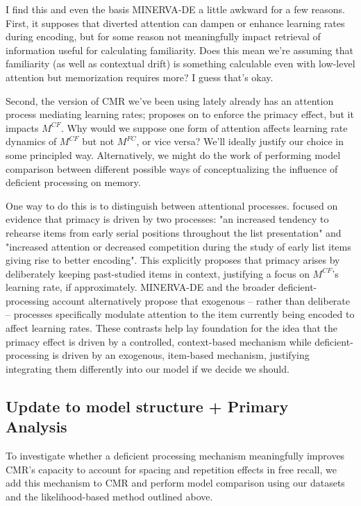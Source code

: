 I find this and even the basis MINERVA-DE a little awkward for a few reasons. First, it supposes that diverted attention can dampen or enhance learning rates during encoding, but for some reason not meaningfully impact retrieval of information useful for calculating familiarity. Does this mean we're assuming that familiarity (as well as contextual drift) is something calculable even with low-level attention but memorization requires more? I guess that's okay.

Second, the version of CMR we've been using lately already has an attention process mediating learning rates; \citet{sederberg2008context} proposes on to enforce the primacy effect, but it impacts $M^{CF}$. Why would we suppose one form of attention affects learning rate dynamics of $M^{CF}$ but not $M^{FC}$, or vice versa? We'll ideally justify our choice in some principled way. Alternatively, we might do the work of performing model comparison between different possible ways of conceptualizing the influence of deficient processing on memory.

One way to do this is to distinguish between attentional processes. \citet{sederberg2008context} focused on evidence that primacy is driven by two processes: "an increased tendency to rehearse items from early serial positions throughout the list presentation" and "increased attention or decreased competition during the study of early list items giving rise to better encoding". This explicitly proposes that primacy arises by deliberately keeping past-studied items in context, justifying a focus on $M^{CF}$'s learning rate, if approximately. MINERVA-DE and the broader deficient-processing account alternatively propose that exogenous -- rather than deliberate -- processes specifically modulate attention to the item currently being encoded to affect learning rates. These contrasts help lay foundation for the idea that the primacy effect is driven by a controlled, context-based mechanism while deficient-processing is driven by an exogenous, item-based mechanism, justifying integrating them differently into our model if we decide we should.

\subsection{Update to model structure + Primary Analysis}
To investigate whether a deficient processing mechanism meaningfully improves CMR's capacity to account for spacing and repetition effects in free recall, we add this mechanism to CMR and perform model comparison using our datasets and the likelihood-based method outlined above.

